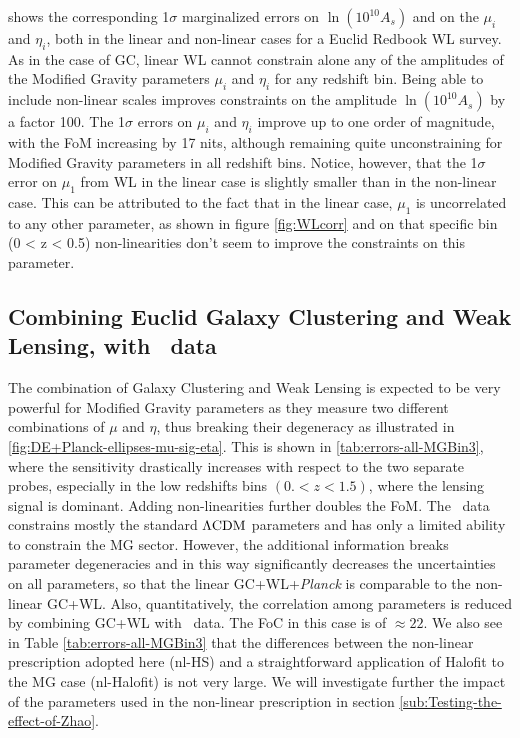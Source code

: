  shows the corresponding 1$\sigma$ marginalized errors on $\ln{(10^{10}A_s)}$
and on the $\mu_i$ and $\eta_i$, both in the linear and 
non-linear cases for a Euclid Redbook WL survey. 
As in the case of GC, linear WL cannot constrain alone any of the amplitudes of 
the Modified Gravity parameters $\mu_i$ and $\eta_i$ for any redshift bin. 
Being able to include non-linear scales improves constraints on the amplitude $\ln(10^{10}A_{s})$ by a factor 100. 
The 1$\sigma$ errors on $\mu_{i}$ and $\eta_{i}$ 
improve up to one order of magnitude, with the FoM increasing by 17 nits, although remaining quite unconstraining for Modified Gravity parameters in all redshift bins.
Notice, however, that the 1$\sigma$ error on $\mu_1$ from WL in the linear case is slightly smaller than in the non-linear case.
This can be attributed to the fact that in the linear case, $\mu_1$ is uncorrelated to any other parameter, as 
shown in figure \ref{fig:WLcorr} and on that specific bin (0 < z < 0.5) non-linearities don't seem to improve the constraints on this parameter.




\subsection{Combining Euclid Galaxy Clustering and Weak Lensing, with \planck\ data \label{sub:Combined-GC-WL-Planck-Binned}}


The combination of Galaxy Clustering and Weak Lensing is expected to be very powerful for 
Modified Gravity parameters as they measure two different combinations of $\mu$ and $\eta$, 
thus breaking their degeneracy as illustrated in  \cref{fig:DE+Planck-ellipses-mu-sig-eta}. 
This is shown in \cref{tab:errors-all-MGBin3}, where the sensitivity drastically increases with respect to the two separate probes, 
especially in the low redshifts bins $(0.<z<1.5)$, where the lensing signal is dominant. 
Adding non-linearities further doubles the FoM. The \planck\ 
data constrains mostly the standard $\Lambda\mathrm{CDM}$ parameters and has only a limited ability to constrain the MG sector. 
However, the additional information breaks parameter degeneracies and in this way significantly decreases
the uncertainties on all parameters, so that the linear GC+WL+{\it Planck} is comparable to the non-linear GC+WL. 
Also, quantitatively, the correlation among parameters is reduced by combining GC+WL with \planck\ data. The FoC in this case is of $\approx 22$.
We also see in Table \ref{tab:errors-all-MGBin3} that the differences between the non-linear prescription
adopted here (nl-HS) and a straightforward application of Halofit to the MG case (nl-Halofit) is not
very large. We will investigate further the impact of the parameters used in the non-linear prescription in section \ref{sub:Testing-the-effect-of-Zhao}.

